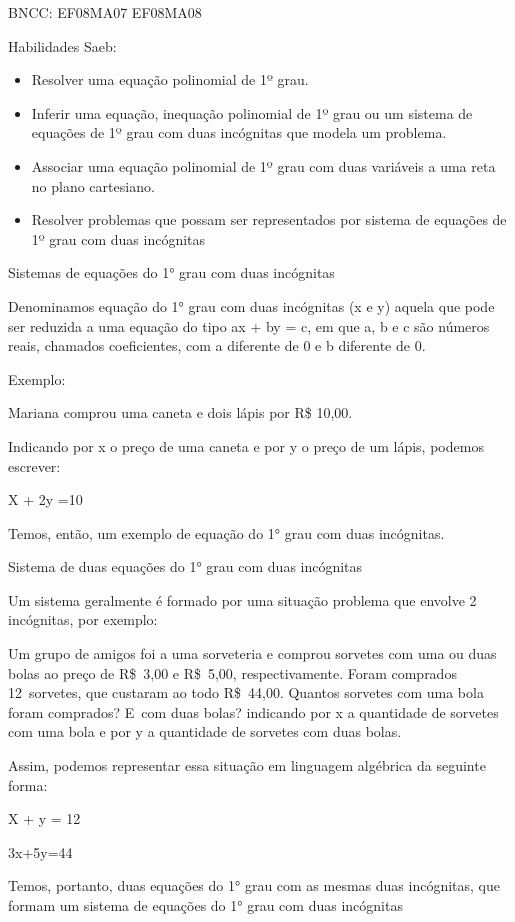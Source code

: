 {BNCC: EF08MA07 EF08MA08

Habilidades Saeb:

\begin{itemize}
\item
  Resolver uma equação polinomial de 1º grau.
\item
  Inferir uma equação, inequação polinomial de 1º grau ou um sistema de
  equações de 1º grau com duas incógnitas que modela um problema.
\item
  Associar uma equação polinomial de 1º grau com duas variáveis a uma
  reta no plano cartesiano.
\item
  Resolver problemas que possam ser representados por sistema de
  equações de 1º grau com duas incógnitas
\end{itemize}

Sistemas de equações do 1° grau com duas incógnitas

Denominamos equação do 1° grau com duas incógnitas (x e y) aquela que
pode ser reduzida a uma equação do tipo ax + by = c, em que a, b e c são
números reais, chamados coeficientes, com a diferente de 0 e b diferente
de 0.

Exemplo:

Mariana comprou uma caneta e dois lápis por R\$ 10,00.

Indicando por x o preço de uma caneta e por y o preço de um lápis,
podemos escrever:

X + 2y =10

Temos, então, um exemplo de equação do 1° grau com duas incógnitas.

Sistema de duas equações do 1° grau com duas incógnitas

Um sistema geralmente é formado por uma situação problema que envolve 2
incógnitas, por exemplo:

Um grupo de amigos foi a uma sorveteria e comprou sorvetes com uma ou
duas bolas ao preço de R\$~3,00 e R\$~5,00, respectivamente. Foram
comprados 12~sorvetes, que custaram ao todo R\$~44,00. Quantos sorvetes
com uma bola foram comprados? E~com duas bolas? indicando por x a
quantidade de sorvetes com uma bola e por y a quantidade de sorvetes com
duas bolas.

Assim, podemos representar essa situação em linguagem algébrica da
seguinte forma:

X + y = 12

3x+5y=44

Temos, portanto, duas equações do 1° grau com as mesmas duas incógnitas,
que formam um sistema de equações do 1° grau com duas incógnitas

}
